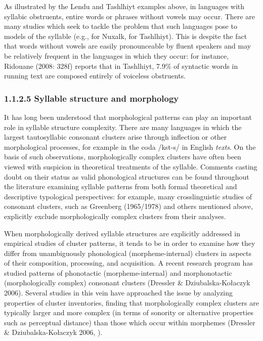   As illustrated by the Lendu and Tashlhiyt examples above, in languages with syllabic obstruents, entire words or phrases without vowels may occur. There are many studies which seek to tackle the problem that such languages pose to models of the syllable (e.g., \citealt{Bagemihl1991} for Nuxalk, \citealt{Coleman2001} for Tashlhiyt). This is despite the fact that words without vowels are easily pronounceable by fluent speakers and may be relatively frequent in the languages in which they occur: for instance, Ridouane (2008: 328f) reports that in Tashlhiyt, 7.9\% of syntactic words in running text are composed entirely of voiceless obstruents. 

\subsubsection{\textbf{1.1.2.5} \textbf{Syllable} \textbf{structure} \textbf{and} \textbf{morphology}}

  It has long been understood that morphological patterns can play an important role in syllable structure complexity. There are many languages in which the largest tautosyllabic consonant clusters arise through inflection or other morphological processes, for example in the coda /kst-s/ in English \textit{texts}. On the basis of such observations, morphologically complex clusters have often been viewed with suspicion in theoretical treatments of the syllable. Comments casting doubt on their status as valid phonological structures can be found throughout the literature examining syllable patterns from both formal theoretical and descriptive typological perspectives: for example, many crosslinguistic studies of consonant clusters, such as Greenberg (1965/1978) and others mentioned above, explicitly exclude morphologically complex clusters from their analyses. 

  When morphologically derived syllable structures are explicitly addressed in empirical studies of cluster patterns, it tends to be in order to examine how they differ from unambiguously phonological (morpheme-internal) clusters in aspects of their composition, processing, and acquisition. A recent research program has studied patterns of phonotactic (morpheme-internal) and morphonotactic (morphologically complex) consonant clusters (Dressler \& Dziubalska-Kołaczyk 2006). Several studies in this vein have approached the issue by analyzing properties of cluster inventories, finding that morphologically complex clusters are typically larger and more complex (in terms of sonority or alternative properties such as perceptual distance) than those which occur within morphemes (Dressler \& Dziubalska-Kołaczyk 2006, \citealt{Orzechowska2012}). 

